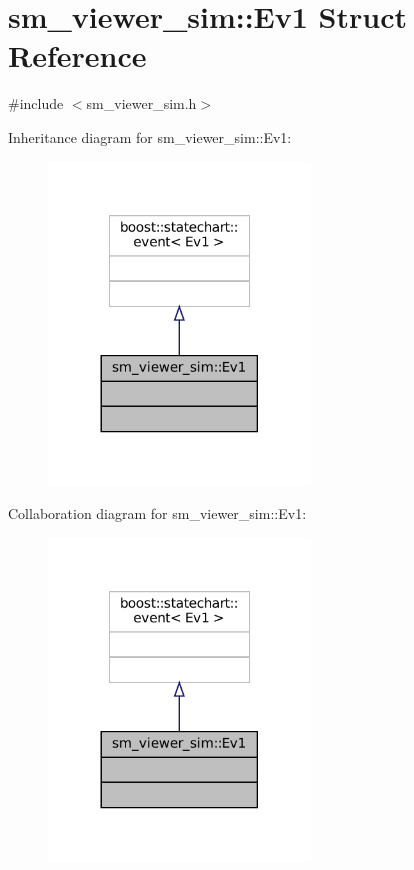 \hypertarget{structsm__viewer__sim_1_1Ev1}{}\section{sm\+\_\+viewer\+\_\+sim\+:\+:Ev1 Struct Reference}
\label{structsm__viewer__sim_1_1Ev1}


{\ttfamily \#include $<$sm\+\_\+viewer\+\_\+sim.\+h$>$}



Inheritance diagram for sm\+\_\+viewer\+\_\+sim\+:\+:Ev1\+:
\nopagebreak
\begin{figure}[H]
\begin{center}
\leavevmode
\includegraphics[width=197pt]{structsm__viewer__sim_1_1Ev1__inherit__graph}
\end{center}
\end{figure}


Collaboration diagram for sm\+\_\+viewer\+\_\+sim\+:\+:Ev1\+:
\nopagebreak
\begin{figure}[H]
\begin{center}
\leavevmode
\includegraphics[width=197pt]{structsm__viewer__sim_1_1Ev1__coll__graph}
\end{center}
\end{figure}


